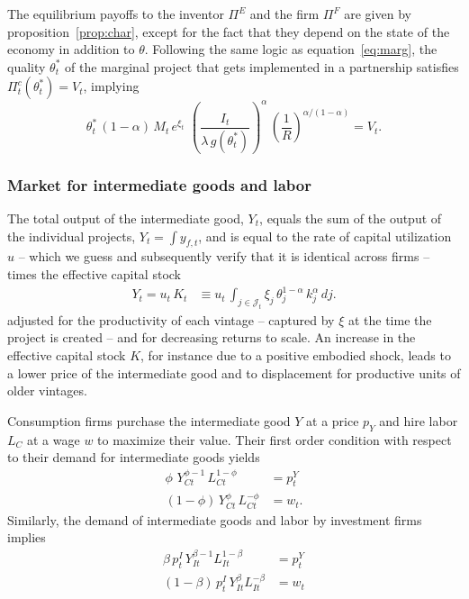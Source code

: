 \documentclass[12pt]{article}
\def\f{f}
\begin{document}
The equilibrium payoffs to the inventor $\Pi^E$ and the firm $\Pi^F$ are given by proposition~\ref{prop:char}, except for the fact that they depend on the state of the economy in addition to $\theta$.
Following the same logic as equation~\eqref{eq:marg}, the quality $\theta^*_t$ of the marginal project that gets implemented in a partnership  satisfies $\Pi_t^c(\theta^*_t)=V_t$, implying
\begin{equation}\label{eq:marg2}
\theta^*_t\,(1-\alpha)\, M_t \,e^{\xi_t}\,  \,\left(\frac{I_t}{ \lambda \, g(\theta_t^*)}\right)^\alpha \,\left(\frac{1}{R}\right)^{\alpha/(1-\alpha)} = V_t.
\end{equation}


\subsubsection{Market  for intermediate goods and labor}

The total output of the intermediate good, ${Y}_t$, equals the sum of the output of the individual projects, $Y_t = \int  y_{\f,t}$, and is equal to the rate of capital utilization $u$ -- which we guess and subsequently verify that it is identical across firms -- times the  effective  capital stock
\begin{align}
Y_t = u_t\, K_t&\equiv  u_t\, \int_{j\in\mathcal{J}_t} {\xi_j}\, \theta_j^{1-\alpha}\,k_j^\alpha\,dj\label{eqn:K}.
\end{align}
adjusted for the productivity of each vintage -- captured by $\xi$ at the time the project is created -- and for decreasing returns to scale. An increase in the effective capital stock $K$, for instance due to a positive embodied shock, leads to a lower price of the intermediate good and to displacement for productive units of older vintages.

Consumption firms  purchase the intermediate good $Y$ at a price $p_Y$ and hire labor $L_C$ at a wage $w$ to maximize their value. Their first order condition with respect to their demand for intermediate goods yields%
\begin{align} \label{FFOC:YC}
\phi\,  \,  {Y}_{Ct}^{\phi-1} \, L_{C t}^{1-\phi} &=  p^Y_{t} \\\label{FFOC:LC}
(1-\phi)\, {Y}_{Ct}^{\phi } \, L_{C t}^{ -\phi}& = w_t.
\end{align}
Similarly, the demand of intermediate goods and labor by investment firms implies
\begin{align} \label{FFOC:YI}
 \beta \, p^I_t  \,     Y_{It}^{\beta-1} L_{It}^{1-\beta} &=  p^Y_{ t}\\\label{FFOC:LI}
   ({1-\beta})\, p^I_t  \,    Y_{It}^\beta L_{It}^{-\beta} &=  w_t
\end{align}
\end{document}
